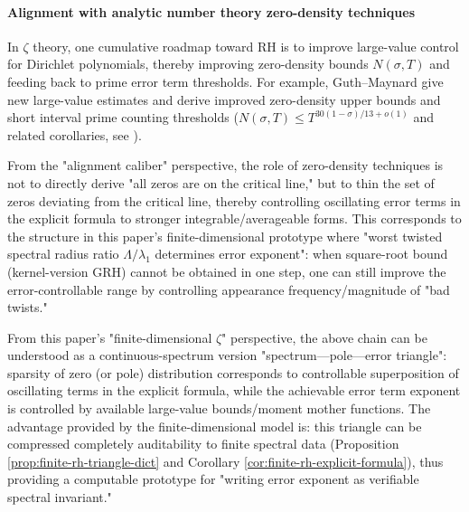 \paragraph{Alignment with analytic number theory zero-density techniques}
In \(\zeta\) theory, one cumulative roadmap toward RH is to improve large-value control for Dirichlet polynomials, thereby improving zero-density bounds \(N(\sigma,T)\) and feeding back to prime error term thresholds.
For example, Guth--Maynard give new large-value estimates and derive improved zero-density upper bounds and short interval prime counting thresholds (\(N(\sigma,T)\le T^{30(1-\sigma)/13+o(1)}\) and related corollaries, see \cite{GuthMaynard2024LargeValues}).

From the "alignment caliber" perspective, the role of zero-density techniques is not to directly derive "all zeros are on the critical line," but to thin the set of zeros deviating from the critical line, thereby controlling oscillating error terms in the explicit formula to stronger integrable/averageable forms.
This corresponds to the structure in this paper's finite-dimensional prototype where "worst twisted spectral radius ratio $\Lambda/\lambda_1$ determines error exponent": when square-root bound (kernel-version GRH) cannot be obtained in one step, one can still improve the error-controllable range by controlling appearance frequency/magnitude of "bad twists."

From this paper's "finite-dimensional \(\zeta\)" perspective, the above chain can be understood as a continuous-spectrum version "spectrum—pole—error triangle": sparsity of zero (or pole) distribution corresponds to controllable superposition of oscillating terms in the explicit formula, while the achievable error term exponent is controlled by available large-value bounds/moment mother functions. The advantage provided by the finite-dimensional model is: this triangle can be compressed completely auditability to finite spectral data (Proposition \ref{prop:finite-rh-triangle-dict} and Corollary \ref{cor:finite-rh-explicit-formula}), thus providing a computable prototype for "writing error exponent as verifiable spectral invariant."

